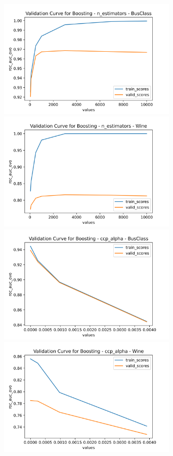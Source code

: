 \documentclass[
	letterpaper, %
]{jdf}
\begin{document}
\includegraphics[width=3.4in]{Figures/BusClass-0920/GBM/val_curve_0.png}
\includegraphics[width=3.4in]{Figures/Wine-0921/GBM/val_curve_0.png}
\includegraphics[width=3.4in]{Figures/BusClass-0920/GBM/val_curve_1.png}
\includegraphics[width=3.4in]{Figures/Wine-0921/GBM/val_curve_1.png}
\end{document}
